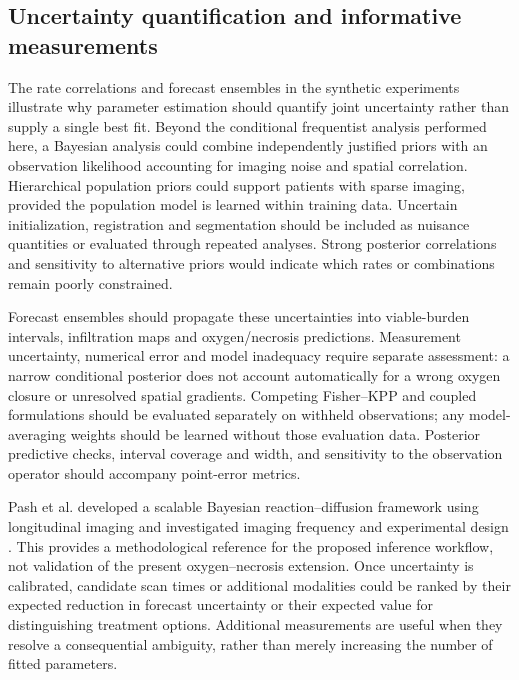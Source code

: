 \subsection{Uncertainty quantification and informative measurements}
The rate correlations and forecast ensembles in the synthetic experiments illustrate why parameter estimation should quantify joint uncertainty rather than supply a single best fit. Beyond the conditional frequentist analysis performed here, a Bayesian analysis could combine independently justified priors with an observation likelihood accounting for imaging noise and spatial correlation. Hierarchical population priors could support patients with sparse imaging, provided the population model is learned within training data. Uncertain initialization, registration and segmentation should be included as nuisance quantities or evaluated through repeated analyses. Strong posterior correlations and sensitivity to alternative priors would indicate which rates or combinations remain poorly constrained.

Forecast ensembles should propagate these uncertainties into viable-burden intervals, infiltration maps and oxygen/necrosis predictions. Measurement uncertainty, numerical error and model inadequacy require separate assessment: a narrow conditional posterior does not account automatically for a wrong oxygen closure or unresolved spatial gradients. Competing Fisher--KPP and coupled formulations should be evaluated separately on withheld observations; any model-averaging weights should be learned without those evaluation data. Posterior predictive checks, interval coverage and width, and sensitivity to the observation operator should accompany point-error metrics.

Pash et al. developed a scalable Bayesian reaction--diffusion framework using longitudinal imaging and investigated imaging frequency and experimental design \citep{pash2026}. This provides a methodological reference for the proposed inference workflow, not validation of the present oxygen--necrosis extension. Once uncertainty is calibrated, candidate scan times or additional modalities could be ranked by their expected reduction in forecast uncertainty or their expected value for distinguishing treatment options. Additional measurements are useful when they resolve a consequential ambiguity, rather than merely increasing the number of fitted parameters.

